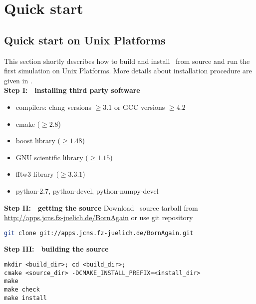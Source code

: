 \newpage
\chapter{Quick start} 

\section{Quick start on Unix Platforms}

This section shortly describes how to build and install \BornAgain\ 
from source  and run the first simulation on Unix Platforms. 
More details about installation procedure are given in . \\

\noindent
{\bf Step I: $~$ installing third party software}
\begin{itemize}
\item compilers: clang  versions $\geq 3.1$ or GCC versions $\geq 4.2$
\item cmake ($\geq 2.8$)
\item boost library ($\geq 1.48$)
\item GNU scientific library ($\geq 1.15$)
\item fftw3 library ($\geq 3.3.1$)
\item python-2.7, python-devel, python-numpy-devel
\end{itemize}
\vspace*{2mm}


\noindent
{\bf Step II: $~$ getting the source} \newline
Download \BornAgain\ source tarball from \url{http://apps.jcns.fz-juelich.de/BornAgain}
or use git repository
\begin{lstlisting}[language=bash, style=commandline]
git clone git://apps.jcns.fz-juelich.de/BornAgain.git 
\end{lstlisting}

\vspace*{3mm}



\noindent
{\bf Step III: $~$ building the source}
\begin{lstlisting}[language=shell, style=commandline]
mkdir <build_dir>; cd <build_dir>;
cmake <source_dir> -DCMAKE_INSTALL_PREFIX=<install_dir>
make
make check
make install
\end{lstlisting}
\vspace*{3mm}



